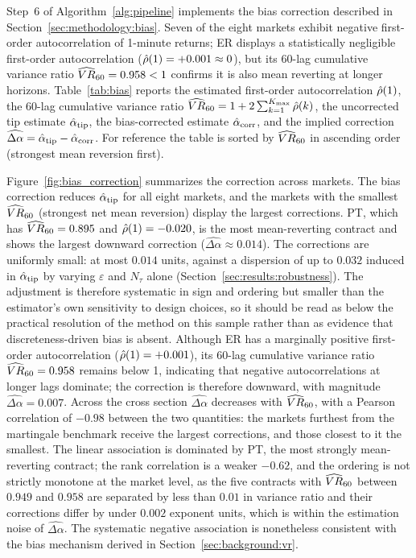 \documentclass[conference]{IEEEtran}
\begin{document}
Step~6 of Algorithm~\ref{alg:pipeline} implements the bias correction
described in Section~\ref{sec:methodology:bias}.
Seven of the eight markets exhibit negative first-order autocorrelation of
1-minute returns; ER displays a statistically negligible first-order autocorrelation
($\hat{\rho}(1)=+0.001\approx 0$), but its 60-lag cumulative variance ratio $\widehat{VR}_{60}=0.958<1$
confirms it is also mean reverting at longer horizons.
Table~\ref{tab:bias} reports the estimated first-order autocorrelation
$\hat{\rho}(1)$, the 60-lag cumulative variance ratio
$\widehat{VR}_{60} = 1 + 2\sum_{k=1}^{K_{\max}}\hat{\rho}(k)$, the uncorrected tip estimate
$\hat{\alpha}_{\mathrm{tip}}$, the bias-corrected estimate $\hat{\alpha}_{\mathrm{corr}}$,
and the implied correction $\widehat{\Delta\alpha} = \hat{\alpha}_{\mathrm{tip}}
- \hat{\alpha}_{\mathrm{corr}}$.
For reference the table is sorted by $\widehat{VR}_{60}$ in ascending order (strongest
mean reversion first).

Figure~\ref{fig:bias_correction} summarizes the correction across markets.
The bias correction reduces $\hat{\alpha}_{\mathrm{tip}}$ for all eight markets, and the markets with
the smallest $\widehat{VR}_{60}$ (strongest net mean reversion) display the largest
corrections.
PT, which has $\widehat{VR}_{60} = 0.895$ and $\hat{\rho}(1) = -0.020$, is the most
mean-reverting contract and shows the largest downward correction
($\widehat{\Delta\alpha}\approx 0.014$).
The corrections are uniformly small: at most $0.014$ units, against a
dispersion of up to $0.032$ induced in $\hat{\alpha}_{\mathrm{tip}}$ by varying
$\varepsilon$ and $N_\tau$ alone (Section~\ref{sec:results:robustness}).
The adjustment is therefore systematic in sign and ordering but smaller than
the estimator's own sensitivity to design choices, so it should be read as
below the practical resolution of the method on this sample rather than as
evidence that discreteness-driven bias is absent.
Although ER has a marginally positive first-order autocorrelation
($\hat{\rho}(1) = +0.001$), its 60-lag cumulative variance ratio $\widehat{VR}_{60} = 0.958$
remains below 1, indicating that negative autocorrelations at longer lags
dominate; the correction is therefore downward, with magnitude
$\widehat{\Delta\alpha} = 0.007$.
Across the cross section $\widehat{\Delta\alpha}$ decreases with
$\widehat{VR}_{60}$, with a Pearson correlation of $-0.98$ between the two
quantities: the markets furthest from the martingale benchmark receive the
largest corrections, and those closest to it the smallest. The linear
association is dominated by PT, the most strongly mean-reverting contract;
the rank correlation is a weaker $-0.62$, and the ordering is
not strictly monotone at the market level, as the five contracts with
$\widehat{VR}_{60}$ between $0.949$ and $0.958$ are separated by less than
$0.01$ in variance ratio and their corrections differ by under
$0.002$ exponent units, which is within the estimation noise of
$\widehat{\Delta\alpha}$. The systematic negative association is nonetheless
consistent with the bias mechanism derived in
Section~\ref{sec:background:vr}.
\end{document}
